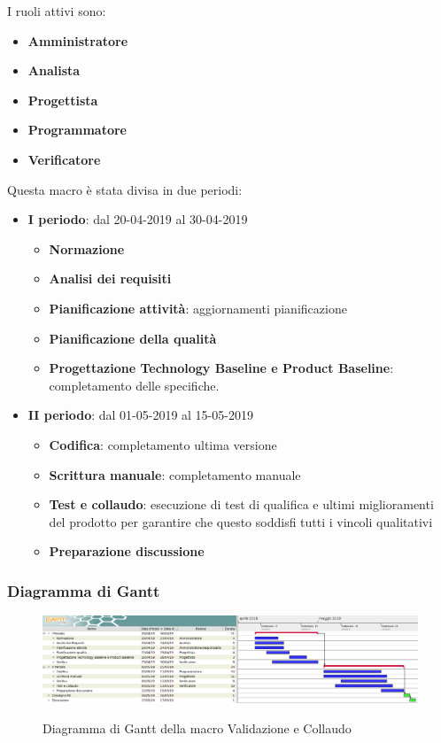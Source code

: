         I ruoli attivi sono: 
        \begin{itemize}
            \item \textbf{Amministratore}
            \item \textbf{Analista}
            \item \textbf{Progettista}
            \item \textbf{Programmatore}
            \item \textbf{Verificatore}
        \end{itemize}
        Questa macro è stata divisa in due periodi:
		\begin{itemize}
			\item \textbf{I periodo}: dal 20-04-2019 al 30-04-2019
			\begin{itemize}
    	        \item \textbf{Normazione}
    	        \item \textbf{Analisi dei requisiti}
    	        \item \textbf{Pianificazione attività}: aggiornamenti pianificazione
    	        \item \textbf{Pianificazione della qualità}
    	        \item \textbf{Progettazione Technology Baseline e Product Baseline}: completamento delle specifiche.
        	\end{itemize}
			\item \textbf{II periodo}: dal 01-05-2019 al 15-05-2019
			\begin{itemize}
    	        \item \textbf{Codifica}: completamento ultima versione
    	        \item \textbf{Scrittura manuale}: completamento manuale
    	        \item \textbf{Test e collaudo}: esecuzione di test di qualifica e ultimi miglioramenti del prodotto per
    	        garantire che questo soddisfi tutti i vincoli qualitativi
    	        \item \textbf{Preparazione discussione}
        	\end{itemize}
		\end{itemize}
        
        \begin{landscape}
			\subsubsection{Diagramma di Gantt}        
			\begin{figure}[H]
					\centering
					\includegraphics[scale=0.44]{img/Validazione_e_collaudo.png}\\
					\caption{Diagramma di Gantt della macro Validazione e Collaudo}
			\end{figure}
		\end{landscape}
		\newpage

